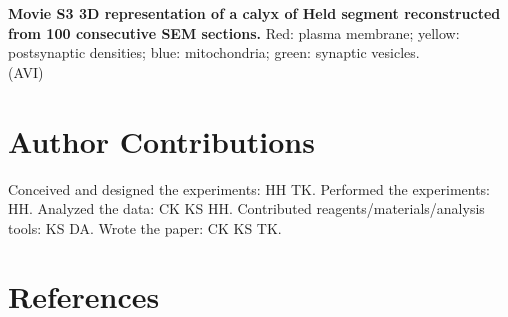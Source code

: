 \documentclass{article}
\begin{document}
\noindent\textbf{Movie S3 3D representation of a calyx of Held segment reconstructed from 100 consecutive SEM sections.} Red: plasma membrane; yellow: postsynaptic densities; blue: mitochondria; green: synaptic vesicles.\\
(AVI)


\section*{Author Contributions}

Conceived and designed the experiments: HH TK. Performed the experiments: HH. Analyzed the data: CK KS HH. Contributed reagents/materials/analysis tools: KS DA. Wrote the paper: CK KS TK.

\section*{References}
\end{document}
